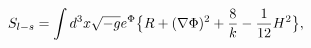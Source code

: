 \begin{equation}
S_{l-s} = \int d^3 x \sqrt{-g} e^{\Phi}
   \big \{ R + (\nabla \Phi)^2 + {8 \over k} - {1 \over 12} H^2  \big \},
\label{action}
\end{equation}

